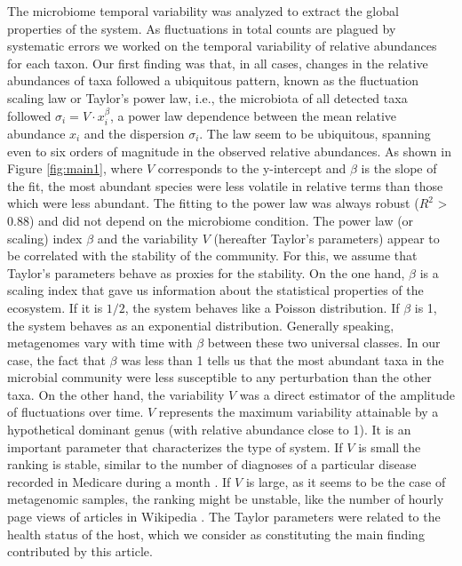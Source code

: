
The microbiome temporal variability was analyzed to extract the global properties of the system. As fluctuations in total counts are plagued by systematic errors we worked on the temporal variability of relative abundances for each taxon. Our first finding was that, in all cases, changes in the relative abundances of taxa followed a ubiquitous pattern, known as the fluctuation scaling law\cite{fs} or Taylor's power law\cite{taylor}, i.e., the microbiota of all detected taxa followed $\sigma_i  = V\cdot x_i^{\beta}$, a power law dependence between the mean relative abundance $x_i$ and the dispersion $\sigma_i$. The law seem to be ubiquitous, spanning even to six orders of magnitude in the observed relative abundances. As shown in Figure \ref{fig:main1}, where $V$ corresponds to the y-intercept and $\beta$ is the slope of the fit, the most abundant species were less volatile in relative terms than those which were less abundant. The fitting to the power law was always robust ($R^{2}$ > 0.88) and did not depend on the microbiome condition. The power law (or scaling) index $\beta$ and the variability $V$ (hereafter Taylor's parameters) appear to be correlated with the stability of the community. For this, we assume that Taylor's parameters behave as proxies for the stability. On the one hand, $\beta$ is a scaling index that gave us information about the statistical properties of the ecosystem. If it is $1/2$, the system behaves like a Poisson distribution. If $\beta$ is 1, the system behaves as an exponential distribution. Generally speaking, metagenomes vary with time with $\beta$ between these two universal classes. In our case, the fact that $\beta$ was less than 1 tells us that the most abundant taxa in the microbial community were less susceptible to any perturbation than the other taxa. On the other hand, the variability $V$ was a direct estimator of the amplitude of fluctuations over time. $V$ represents the maximum variability attainable by a hypothetical dominant genus (with relative abundance close to 1). It is an important parameter that characterizes the type of system. If $V$ is small the ranking is stable, similar to the number of diagnoses of a particular disease recorded in Medicare  during a month \cite{medicare}. If $V$ is large, as it seems to be the case of metagenomic samples, the ranking might be unstable, like the number of hourly page views of articles in Wikipedia \cite{ranking,fs}. The Taylor parameters were related to the health status of the host, which we consider as constituting the main finding contributed by this article.

